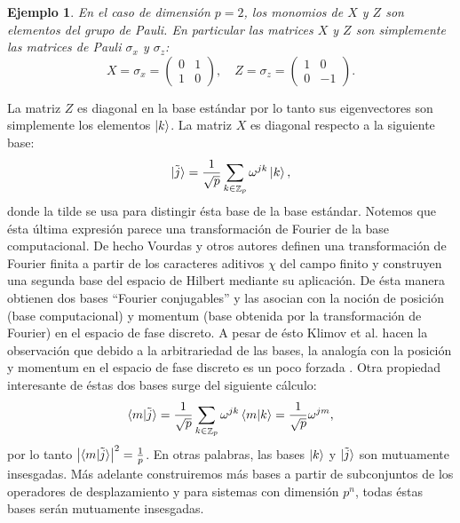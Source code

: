 \documentclass[a4paper,11pt]{report}
\DeclareMathOperator{\Z}{\mathbb{Z}}
\newtheorem{example}{Ejemplo}
\begin{document}
  \begin{example}
    En el caso de dimensión $p = 2$, los monomios de $X$ y
    $Z$ son elementos del \textit{grupo de Pauli}. En
    particular las matrices $X$ y $Z$ son simplemente las
    matrices de Pauli $\sigma_x$ y $\sigma_z$:
    \[
      X = \sigma_x =
      \begin{pmatrix} 0 & 1 \\ 1 & 0 \end{pmatrix},
      \quad
      Z = \sigma_z =
      \begin{pmatrix} 1 & 0 \\ 0 & -1 \end{pmatrix}. 
    \] 
  \end{example}
  La matriz $Z$ es diagonal en la base estándar por lo tanto
  sus eigenvectores son simplemente los elementos $\ket k$.
  La matriz $X$ es diagonal respecto a la siguiente base:
  \[
    \ket{\tilde j}
    = \frac{1}{\sqrt{p}} \sum_{k \in \Z_p}^{}
    \omega^{j k} \ket k,
  \] 
  donde la tilde se usa para distingir ésta base de la base
  estándar. Notemos que ésta última expresión parece una
  transformación de Fourier de la base computacional. De
  hecho Vourdas y otros autores definen una transformación
  de Fourier finita a partir de los caracteres aditivos
  $\chi$ del campo finito y construyen una segunda base del
  espacio de Hilbert mediante su aplicación. De ésta manera
  obtienen dos bases ``Fourier conjugables'' y las asocian
  con la noción de posición (base computacional) y momentum
  (base obtenida por la transformación de Fourier) en el
  espacio de fase discreto. A pesar de ésto Klimov et al.
  hacen la observación que debido a la arbitrariedad de las
  bases, la analogía con la posición y momentum en el
  espacio de fase discreto es un poco forzada
  \cite{bjork2008}. Otra propiedad interesante de éstas dos
  bases surge del siguiente cálculo:
  \begin{equation}
    \braket{m|\tilde j}
    = \frac{1}{\sqrt{p}}
    \sum_{k \in \Z_p}^{} \omega^{jk} \braket{m|k}
    = \frac{1}{\sqrt{p}} \omega^{jm},
  \end{equation}
  por lo tanto $\left|\braket{m|\tilde j}\right|^2 =
  \frac{1}{p}$. En otras palabras, las bases $\ket k$ y
  $\ket{\tilde j}$ son mutuamente insesgadas. Más adelante
  construiremos más bases a partir de subconjuntos de los
  operadores de desplazamiento y para sistemas con dimensión
  $p^{n}$, todas éstas bases serán mutuamente insesgadas.
\end{document}
